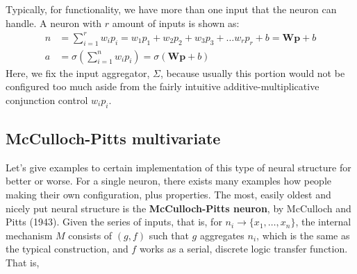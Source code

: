 Typically, for functionality, we have more than one input that the neuron can handle. A neuron with $r$ amount of inputs is shown as: 
\begin{align}
    n & = \sum^{r}_{i=1}w_{i}p_{i}= w_{1}p_{1} + w_{2}p_{2}+w_{3}p_{3}+\dots w_{r}p_{r} + b= \mathbf{W}\mathbf{p}+b\\
    a & = \sigma\left(\sum^{n}_{i=1}w_{i}p_{i}\right) = \sigma(\mathbf{Wp}+b)
\end{align}
Here, we fix the input aggregator, $\Sigma$, because usually this portion would not be configured too much aside from the fairly intuitive additive-multiplicative conjunction control $w_{i}p_{i}$. 
\subsection{McCulloch-Pitts multivariate}
Let's give examples to certain implementation of this type of neural structure for better or worse. For a single neuron, there exists many examples how people making their own configuration, plus properties. The most, easily oldest and nicely put neural structure is the \textbf{McCulloch-Pitts neuron}, by McCulloch and Pitts (1943). Given the series of inputs, that is, for $n_i \to \{x_1,\dots,x_n\}$, the internal mechanism $M$ consists of $(g,f)$ such that $g$ aggregates $n_{i}$, which is the same as the typical construction, and $f$ works as a serial, discrete logic transfer function. That is, 


